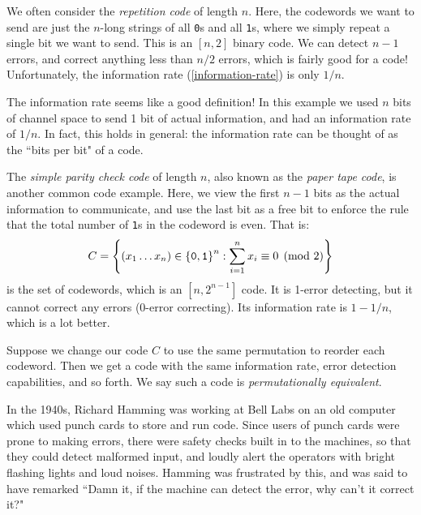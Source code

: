 \documentclass{article}
\begin{document}
We often consider the \textit{repetition code} of length $n$.
Here, the codewords we want to send are just
the $n$-long strings of all \texttt{0}s and all \texttt{1}s,
where we simply repeat a single bit we want to send.
This is an $[n, 2]$ binary code.
We can detect $n-1$ errors,
and correct anything less than $n/2$ errors,
which is fairly good for a code!
Unfortunately, the information rate (\ref{information-rate}) is only $1/n$.

\begin{note}
	The information rate seems like a good definition!
	In this example we used $n$ bits of channel space
	to send 1 bit of actual information,
	and had an information rate of $1/n$.
	In fact, this holds in general:
	the information rate can be thought of as the ``bits per bit" of a code.
\end{note}

\begin{example}
    The \textit{simple parity check code} of length $n$,
    also known as the \textit{paper tape code},
    is another common code example.
    Here, we view the first $n-1$ bits as the actual information to communicate,
    and use the last bit as a free bit to enforce the rule that
    the total number of \texttt{1}s in the codeword is even. That is:
    \[
	C = \left\lbrace (x_1 \dots x_n) \in \left\lbrace \texttt{0}, \texttt{1} \right\rbrace^n : \sum_{i=1}^n x_i \equiv 0 \pmod 2 \right\rbrace
	\]
	is the set of codewords, which is an $[n, 2^{n-1}]$ code.
	It is 1-error detecting,
	but it cannot correct any errors (0-error correcting).
	Its information rate is $1 - 1/n$, which is a lot better.
\end{example}

\begin{note}
	Suppose we change our code $C$
	to use the same permutation to reorder each codeword.
	Then we get a code with the same information rate,
	error detection capabilities, and so forth.
	We say such a code is \textit{permutationally equivalent}.
\end{note}

In the 1940s, Richard Hamming was working at Bell Labs on an old computer which used punch cards to store and run code. Since users of punch cards were prone to making errors, there were safety checks built in to the machines, so that they could detect malformed input, and loudly alert the operators with bright flashing lights and loud noises. Hamming was frustrated by this, and was said to have remarked ``Damn it, if the machine can detect the error, why can't it correct it?"
\end{document}
